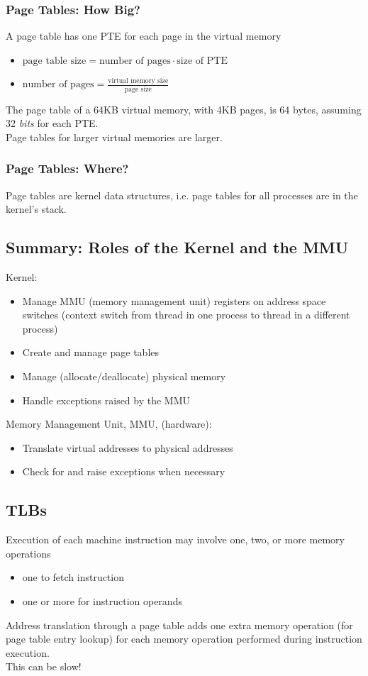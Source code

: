 \documentclass[12pt]{article}
\theoremstyle{plain}
\theoremstyle{definition}
\begin{document}
\subsubsection{Page Tables: How Big?}
A page table has one PTE for each page in the virtual memory
\begin{itemize}
  \item $\text{page table size} = \text{number of pages} \cdot \text{size of PTE}$
  \item $\text{number of pages} = \frac{\text{virtual memory size}}{\text{page size}}$
\end{itemize}
The page table of a 64KB virtual memory, with 4KB pages, is 64 bytes, assuming 32 \emph{bits} for each PTE. \\
Page tables for larger virtual memories are larger.

\subsubsection{Page Tables: Where?}
Page tables are kernel data structures, i.e. page tables for all processes are in the kernel's stack.

\subsection{Summary: Roles of the Kernel and the MMU}
Kernel:
\begin{itemize}
  \item Manage MMU (memory management unit) registers on address space switches (context switch from thread in one process to thread in a different process)
  \item Create and manage page tables
  \item Manage (allocate/deallocate) physical memory
  \item Handle exceptions raised by the MMU
\end{itemize}
Memory Management Unit, MMU, (hardware):
\begin{itemize}
  \item Translate virtual addresses to physical addresses
  \item Check for and raise exceptions when necessary
\end{itemize}

\subsection{TLBs}
Execution of each machine instruction may involve one, two, or more memory operations
\begin{itemize}
  \item one to fetch instruction
  \item one or more for instruction operands
\end{itemize}
Address translation through a page table adds one extra memory operation (for page table entry lookup) for each memory operation performed during instruction execution. \\
This can be slow! \\
\end{document}
